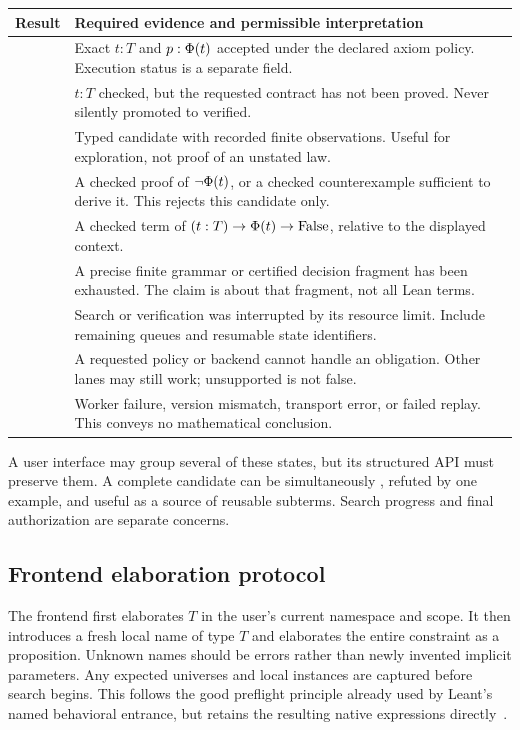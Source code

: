 \begin{longtable}{@{}L{0.25\textwidth}L{0.69\textwidth}@{}}
\toprule
Result & Required evidence and permissible interpretation \\
\midrule\endhead
{} & Exact $t:T$ and $p:\Phi(t)$ accepted under the declared axiom policy. Execution status is a separate field. \\
 & $t:T$ checked, but the requested contract has not been proved. Never silently promoted to verified. \\
 & Typed candidate with recorded finite observations. Useful for exploration, not proof of an unstated law. \\
 & A checked proof of $\neg\Phi(t)$, or a checked counterexample sufficient to derive it. This rejects this candidate only. \\
 & A checked term of $(t:T)\to\Phi(t)\to\operatorname{False}$, relative to the displayed context. \\
 & A precise finite grammar or certified decision fragment has been exhausted. The claim is about that fragment, not all Lean terms. \\
 & Search or verification was interrupted by its resource limit. Include remaining queues and resumable state identifiers. \\
 & A requested policy or backend cannot handle an obligation. Other lanes may still work; unsupported is not false. \\
 & Worker failure, version mismatch, transport error, or failed replay. This conveys no mathematical conclusion. \\
\bottomrule
\end{longtable}

A user interface may group several of these states, but its structured API must preserve them. A complete candidate can be simultaneously , refuted by one example, and useful as a source of reusable subterms. Search progress and final authorization are separate concerns.

\subsection{Frontend elaboration protocol}

The frontend first elaborates $T$ in the user's current namespace and scope. It then introduces a fresh local name of type $T$ and elaborates the entire constraint as a proposition. Unknown names should be errors rather than newly invented implicit parameters. Any expected universes and local instances are captured before search begins. This follows the good preflight principle already used by Leant's named behavioral entrance, but retains the resulting native expressions directly~\cite{behavior}.

